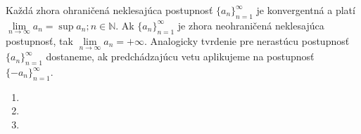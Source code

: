 \begin{veta}
Každá zhora ohraničená neklesajúca postupnosť ${\{a_n\}}_{n=1}^\infty$ je
konvergentná a platí $\lim\limits_{n \rightarrow \infty} a_n=\sup {a_n;n \in
\mathbb{N}}$. Ak ${\{a_n\}}_{n=1}^\infty$ je zhora neohraničená neklesajúca
postupnosť, tak $\lim\limits_{n \rightarrow \infty} a_n=+\infty$. Analogicky tvrdenie
pre nerastúcu postupnosť ${\{a_n\}}_{n=1}^\infty$  dostaneme, ak predchádzajúcu
vetu aplikujeme na postupnosť ${\{-a_n\}}_{n=1}^\infty$.
\end{veta}

\begin{enumerate}[resume]
  \item {}
  \item {}
  \item {}
\end{enumerate}
